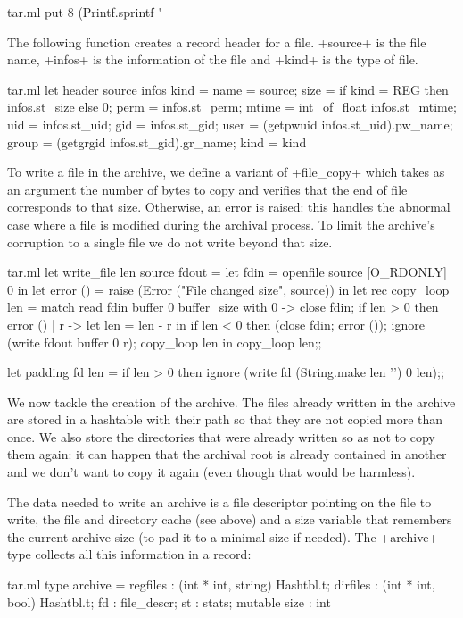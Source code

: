 \begin{answer}
\begin{listingcodefile}{tar.ml}
  put 8 (Printf.sprintf "%
\end{listingcodefile}
%
The following function creates a record header for a file. \ml+source+ is
the file name, \ml+infos+ is the  information of
the file and \ml+kind+ is the type of file. 
%
\begin{listingcodefile}{tar.ml}
let header source infos kind = {
  name = source; 
  size = if kind = REG then infos.st_size else 0; 
  perm = infos.st_perm; 
  mtime = int_of_float infos.st_mtime; 
  uid = infos.st_uid;
  gid = infos.st_gid;
  user = (getpwuid infos.st_uid).pw_name;
  group = (getgrgid infos.st_gid).gr_name;
  kind = kind }
\end{listingcodefile}
%
To write a file in the archive, we define a variant of \ml+file_copy+
which takes as an argument the number of bytes to copy and verifies
that the end of file corresponds to that size. Otherwise, an error is
raised: this handles the abnormal case where a file is modified during
the archival process. To limit the archive's corruption to a single
file we do not write beyond that size. 
%
\begin{listingcodefile}{tar.ml}
let write_file len source fdout =
  let fdin = openfile source [O_RDONLY] 0 in
  let error () = raise (Error ("File changed size", source)) in
  let rec copy_loop len =
    match read fdin buffer 0 buffer_size with
      0 -> 
        close fdin; if len > 0 then error ()
    | r -> 
        let len = len - r  in
        if len < 0 then (close fdin; error ()); 
        ignore (write fdout buffer 0 r); copy_loop len in
  copy_loop len;;

let padding fd len =
  if len > 0 then ignore (write fd (String.make len '') 0 len);;
\end{listingcodefile}
%
We now tackle the creation of the archive. The files already written
in the archive are stored in a hashtable with their path so that they
are not copied more than once. We also store the directories that were
already written so as not to copy them again: it can happen that the
archival root is already contained in another and we don't want to
copy it again (even though that would be harmless). 

The data needed to write an archive is a file descriptor pointing on
the file to write, the file and directory cache (see above) and a size
variable that remembers the current archive size (to pad it to a
minimal size if needed). The \ml+archive+ type collects all this
information in a record:
%
\begin{listingcodefile}{tar.ml}
type archive = 
    { regfiles : (int * int, string) Hashtbl.t; 
      dirfiles : (int * int, bool) Hashtbl.t;
      fd : file_descr; st : stats; mutable size : int }


\end{listingcodefile}
\end{answer}
